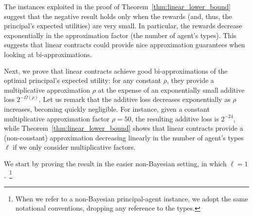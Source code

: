 %
The instances exploited in the proof of Theorem~\ref{thm:linear_lower_bound} suggest that the negative result holds only when the rewards (and, thus, the principal's expected utilities) are very small.
%
In particular, the rewards decrease exponentially in the approximation factor (the number of agent's types).
%
This suggests that linear contracts could provide nice approximation guarantees when looking at bi-approximations. 

Next, we prove that linear contracts achieve good bi-approximations of the optimal principal's expected utility: for any constant $\rho$, 
they provide a multiplicative approximation $\rho$ at the expense of an exponentially small additive loss $2^{-\Omega \left(  \rho \right) }$.
%
%
Let us remark that the additive loss decreases exponentially as $\rho$ increases, becoming quickly negligible.
%
For instance, given a constant multiplicative approximation factor $\rho = 50$, the resulting additive loss is $2^{-24}$, while Theorem~\ref{thm:linear_lower_bound} shows that linear contracts provide a (non-constant) approximation decreasing linearly in the number of agent's types $\ell$ if we only consider multiplicative factors.
%
%
%


We start by proving the result in the easier non-Bayesian setting, in which $\ell = 1$.~\footnote{When we refer to a non-Bayesian principal-agent instance, we adopt the same notational conventions, dropping any reference to the types.}


